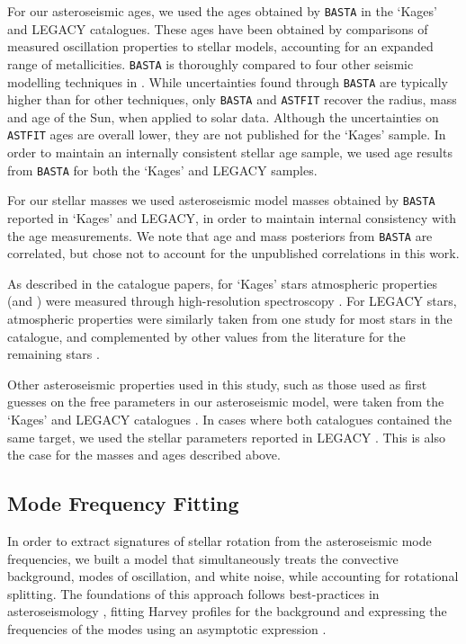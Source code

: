 For our asteroseismic ages, we used the ages obtained by \texttt{BASTA} \cite[BAyesian STellar Algorithm]{m_silvaaguirre+2015} in the `Kages' and LEGACY catalogues. These ages have been obtained by comparisons of measured oscillation properties to stellar models, accounting for an expanded range of metallicities. \texttt{BASTA} is thoroughly compared to four other seismic modelling techniques in \cite{m_silvaaguirre+2017}. While uncertainties found through \texttt{BASTA} are typically higher than for other techniques, only \texttt{BASTA} and \texttt{ASTFIT} \cite[Aarhus STellar Evolution Code]{m_christensen-dalsgaard2008} recover the radius, mass and age of the Sun, when applied to solar data. Although the uncertainties on \texttt{ASTFIT} ages are overall lower, they are not published for the `Kages' sample. In order to maintain an internally consistent stellar age sample, we used age results from \texttt{BASTA} for both the `Kages' and LEGACY samples.

For our stellar masses we used asteroseismic model masses obtained by \texttt{BASTA} reported in `Kages' and LEGACY, in order to maintain internal consistency with the age measurements. We note that age and mass posteriors from \texttt{BASTA} are correlated, but chose not to account for the unpublished correlations in this work.

As described in the catalogue papers, for `Kages' stars atmospheric properties (\teff and \feh) were measured through high-resolution spectroscopy \cite{m_huber+2013a}. For LEGACY stars, atmospheric properties were similarly taken from one study \cite{m_buchhave+latham2015} for most stars in the catalogue, and complemented by other values from the literature for the remaining stars \cite[see Table 3]{m_silvaaguirre+2017}.

Other asteroseismic properties used in this study, such as those used as first guesses on the free parameters in our asteroseismic model, were taken from the `Kages' and LEGACY catalogues \cite{m_astropycollaboration+2013, m_astropycollaboration+2018, m_ginsburg+2019}. In cases where both catalogues contained the same target, we used the stellar parameters reported in LEGACY \cite{m_mckinney2010}. This is also the case for the masses and ages described above.

\subsection{Mode Frequency Fitting}

In order to extract signatures of stellar rotation from the asteroseismic mode frequencies, we built a model that simultaneously treats the convective background, modes of oscillation, and white noise, while accounting for rotational splitting. The foundations of this approach follows best-practices in asteroseismology \cite{m_davies+2015}, fitting Harvey profiles for the background \cite{m_harvey1985} and expressing the frequencies of the modes using an asymptotic expression \cite{m_tassoul1980, m_vrard+2016}.

